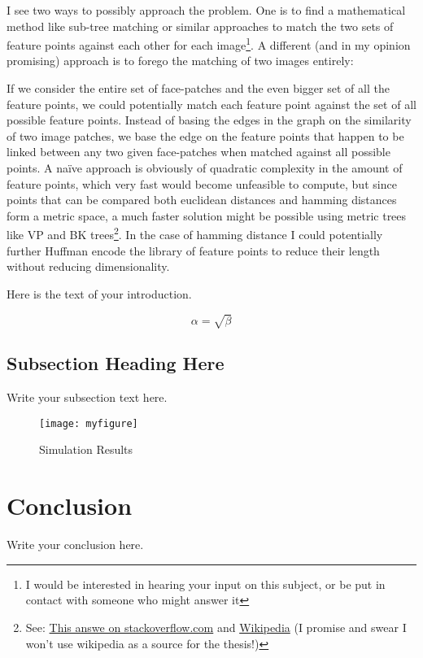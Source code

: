 \documentclass{article}
\begin{document}
I see two ways to possibly approach the problem. One is to find a mathematical 
method like sub-tree matching or similar approaches to match the two sets of 
feature points against each other for each image\footnote{I would be interested 
in hearing your input on this subject, or be put in contact with someone who 
might answer it}. A different (and in my opinion promising) approach is to 
forego the matching of two images entirely:

If we consider the entire set of face-patches and the even bigger set of all 
the feature points, we could potentially match each feature point against the 
set of all possible feature points. Instead of basing the edges in the graph on 
the similarity of two image patches, we base the edge on the feature points 
that happen to be linked between any two given face-patches when matched 
against all possible points. A na\"ive approach is obviously of quadratic 
complexity in the amount of feature points, which very fast would become 
unfeasible to compute, but since points that can be compared both euclidean 
distances and hamming distances form a metric space, a much faster solution 
might be possible using metric trees like VP and BK trees\footnote{See: 
\href{http://stackoverflow.com/questions/6389841/efficiently-find-binary-strings-with-low-hamming-distance-in-large-set}{This 
answe on stackoverflow.com} and 
\href{http://en.wikipedia.org/wiki/Metric_tree}{Wikipedia} (I promise and swear 
I won't use wikipedia as a source for the thesis!)
}. In the case of hamming distance I could potentially further Huffman encode 
the library of feature points to reduce their length without reducing 
dimensionality.




Here is the text of your introduction.

\begin{equation}
    \label{simple_equation}
    \alpha = \sqrt{ \beta }
\end{equation}

\subsection{Subsection Heading Here}
Write your subsection text here.

\begin{figure}
    \centering
    \texttt{[image: myfigure]}
    \caption{Simulation Results}
    \label{simulationfigure}
\end{figure}

\section{Conclusion}
Write your conclusion here.
\end{document}
